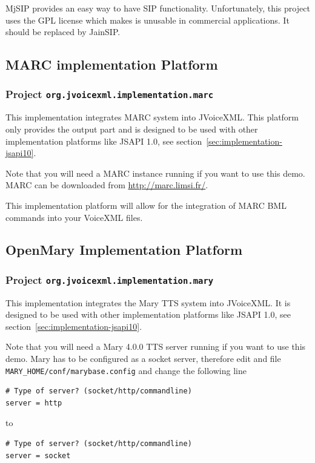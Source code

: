 \documentclass[11pt,a4paper]{article}
\begin{document}
MjSIP provides an easy way to have SIP functionality. Unfortunately, this
project uses the GPL license which makes is unusable in commercial
applications. It should be replaced by JainSIP.

\subsection{MARC implementation Platform}
\subsubsection{Project \texttt{org.jvoicexml.implementation.marc}}

This implementation integrates MARC system into JVoiceXML. This platform
only provides the output part and is designed to be used with other
implementation platforms like JSAPI 1.0, see section~\ref{sec:implementation-jsapi10}.

Note that you will need a MARC instance running if you want to use this
demo. MARC can be downloaded from \url{http://marc.limsi.fr/}.

This implementation platform will allow for the integration of MARC BML commands
into your VoiceXML files.

\subsection{OpenMary Implementation Platform}
\subsubsection{Project \texttt{org.jvoicexml.implementation.mary}}

This implementation integrates the Mary TTS system into JVoiceXML. It is
designed to be used with other implementation platforms like JSAPI 1.0, see
section~\ref{sec:implementation-jsapi10}.

Note that you will need a Mary 4.0.0  TTS server running if you want to use this
demo. Mary has to be configured as a socket server, therefore edit and file
\texttt{MARY\_HOME/conf/marybase.config} and change the following line 

\begin{lstlisting}
# Type of server? (socket/http/commandline)
server = http
\end{lstlisting}

to

\begin{lstlisting}
# Type of server? (socket/http/commandline)
server = socket
\end{lstlisting}
\end{document}
